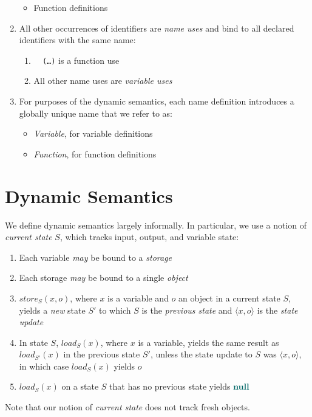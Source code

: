 \documentclass{article}
\newcommand{\ulm}[1]{%
  \uline{\phantom{#1}}%
  \llap{\contour{white}{#1}}%
}
\newcommand{\tuple}[1]{\ensuremath{\langle #1 \rangle}}
\newcommand{\code}[1]{\texttt{\textcolor{dgreen}{#1}}}
\newcommand{\Vnull}[0]{\textbf{\textcolor{dcyan}{null}}}
\begin{document}
\begin{enumerate}
\begin{itemize}
    \item Function definitions
    \end{itemize}
  \item All other occurrences of identifiers are \emph{name uses} and bind to all declared identifiers with the same name:
    \begin{enumerate}
    \item \code{\ulm{f} (\ldots)} is a function use
    \item All other name uses are \emph{variable uses}
    \end{enumerate}
  \item For purposes of the dynamic semantics, each name definition introduces a globally unique name that we refer to as:
    \begin{itemize}
    \item \emph{Variable}, for variable definitions
    \item \emph{Function}, for function definitions
    \end{itemize}
\end{enumerate}

\section{Dynamic Semantics}

We define dynamic semantics largely informally.  In particular, we use
a notion of \emph{current state} $S$, which tracks input, output, and variable state:
\begin{enumerate}
\item Each variable \emph{may} be bound to a \emph{storage}
\item Each storage \emph{may} be bound to a single \emph{object}
\item $\textit{store}_S(x, o)$, where $x$ is a variable and $o$ an object in a current state $S$, yields a \emph{new} state $S'$ to which $S$ is the \emph{previous state} and $\tuple{x,o}$ is the \emph{state update}
\item In state $S$, $\textit{load}_S(x)$, where $x$ is a variable, yields the same result as $\textit{load}_{S'}(x)$ in the previous state $S'$, unless the state update to $S$ was $\tuple{x, o}$, in which case $\textit{load}_{S}(x)$ yields $o$
\item $\textit{load}_S(x)$ on a state $S$ that has no previous state yields $\Vnull$
\end{enumerate}
Note that our notion of \emph{current state} does not track fresh objects.
\end{document}
